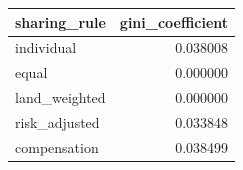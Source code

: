 \begin{tabular}{lr}
\toprule
sharing\_rule & gini\_coefficient \\
\midrule
individual & 0.038008 \\
equal & 0.000000 \\
land\_weighted & 0.000000 \\
risk\_adjusted & 0.033848 \\
compensation & 0.038499 \\
\bottomrule
\end{tabular}
